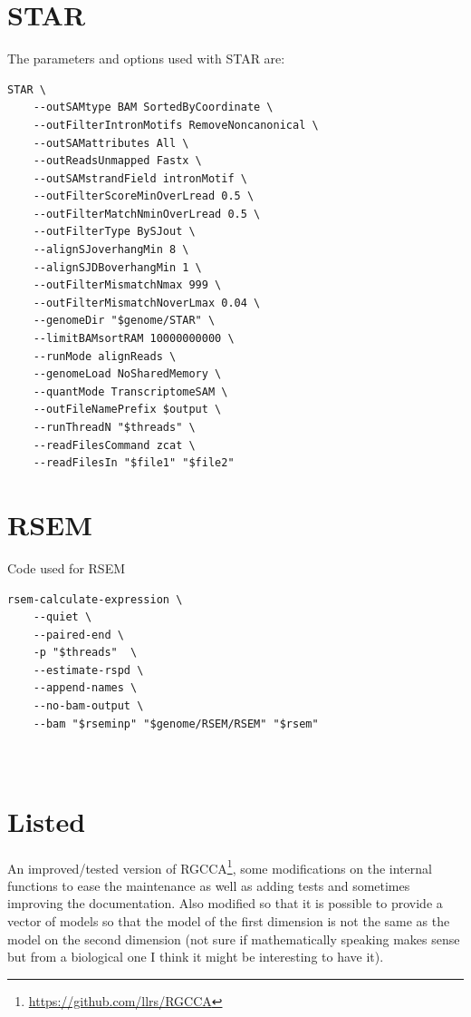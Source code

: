 \documentclass[
  a4paper,
]{book}
\DeclareRobustCommand{\href}[2]{#2\footnote{\url{#1}}}
\begin{document}
\hypertarget{star}{%
\section{STAR}\label{star}}

The parameters and options used with STAR are:

\begin{verbatim}
STAR \
    --outSAMtype BAM SortedByCoordinate \
    --outFilterIntronMotifs RemoveNoncanonical \
    --outSAMattributes All \
    --outReadsUnmapped Fastx \
    --outSAMstrandField intronMotif \
    --outFilterScoreMinOverLread 0.5 \
    --outFilterMatchNminOverLread 0.5 \
    --outFilterType BySJout \
    --alignSJoverhangMin 8 \
    --alignSJDBoverhangMin 1 \
    --outFilterMismatchNmax 999 \
    --outFilterMismatchNoverLmax 0.04 \
    --genomeDir "$genome/STAR" \
    --limitBAMsortRAM 10000000000 \
    --runMode alignReads \
    --genomeLoad NoSharedMemory \
    --quantMode TranscriptomeSAM \
    --outFileNamePrefix $output \
    --runThreadN "$threads" \
    --readFilesCommand zcat \
    --readFilesIn "$file1" "$file2"
\end{verbatim}

\hypertarget{rsem}{%
\section{RSEM}\label{rsem}}

Code used for RSEM

\begin{verbatim}
rsem-calculate-expression \
    --quiet \
    --paired-end \
    -p "$threads"  \
    --estimate-rspd \
    --append-names \
    --no-bam-output \
    --bam "$rseminp" "$genome/RSEM/RSEM" "$rsem"
    
    
\end{verbatim}

\hypertarget{listed}{%
\section{Listed}\label{listed}}

An improved/tested version of \href{https://github.com/llrs/RGCCA}{RGCCA}, some modifications on the internal functions to ease the maintenance as well as adding tests and sometimes improving the documentation.
Also modified so that it is possible to provide a vector of models so that the model of the first dimension is not the same as the model on the second dimension (not sure if mathematically speaking makes sense but from a biological one I think it might be interesting to have it).
\end{document}
